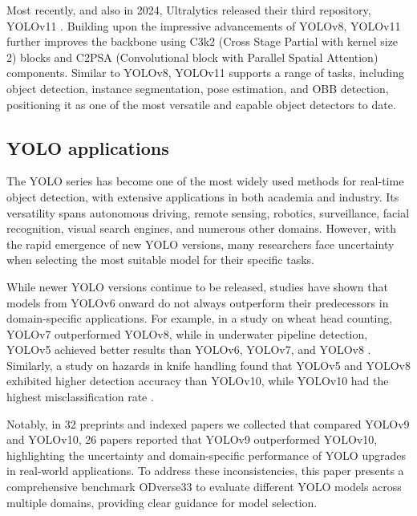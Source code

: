 \documentclass[runningheads]{llncs}
\begin{document}
Most recently, and also in 2024, Ultralytics released their third repository, YOLOv11 \cite{Jocher2024}. Building upon the impressive advancements of YOLOv8, YOLOv11 further improves the backbone using C3k2 (Cross Stage Partial with kernel size 2) blocks and C2PSA (Convolutional block with Parallel Spatial Attention) components. Similar to YOLOv8, YOLOv11 supports a range of tasks, including object detection, instance segmentation, pose estimation, and OBB detection, positioning it as one of the most versatile and capable object detectors to date.





\subsection{YOLO applications}
The YOLO series has become one of the most widely used methods for real-time object detection, with extensive applications in both academia and industry. Its versatility spans autonomous driving, remote sensing, robotics, surveillance, facial recognition, visual search engines, and numerous other domains. However, with the rapid emergence of new YOLO versions, many researchers face uncertainty when selecting the most suitable model for their specific tasks.

While newer YOLO versions continue to be released, studies have shown that models from YOLOv6 onward do not always outperform their predecessors in domain-specific applications. For example, in a study on wheat head counting, YOLOv7 outperformed YOLOv8, while in underwater pipeline detection, YOLOv5 achieved better results than YOLOv6, YOLOv7, and YOLOv8 \cite{Gasparovic2023}. Similarly, a study on hazards in knife handling found that YOLOv5 and YOLOv8 exhibited higher detection accuracy than YOLOv10, while YOLOv10 had the highest misclassification rate \cite{Geetha2024}.

Notably, in 32 preprints and indexed papers we collected that compared YOLOv9 and YOLOv10, 26 papers reported that YOLOv9 outperformed YOLOv10, highlighting the uncertainty and domain-specific performance of YOLO upgrades in real-world applications. To address these inconsistencies, this paper presents a comprehensive benchmark ODverse33 to evaluate different YOLO models across multiple domains, providing clear guidance for model selection.
\end{document}
